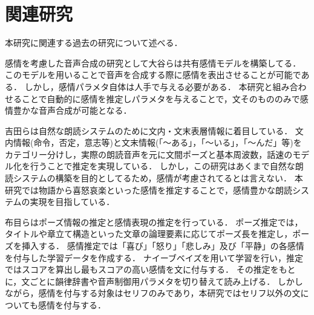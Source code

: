 \chapter{関連研究}
本研究に関連する過去の研究について述べる．

感情を考慮した音声合成の研究として大谷\cite{otani}らは共有感情モデルを構築してる．
このモデルを用いることで音声を合成する際に感情を表出させることが可能である．
しかし，感情パラメタ自体は人手で与える必要がある．
本研究と組み合わせることで自動的に感情を推定しパラメタを与えることで，文そのもののみで感情豊かな音声合成が可能となる．

吉田ら\cite{yoshida}は自然な朗読システムのために文内・文末表層情報に着目している．
文内情報(命令，否定，意志等)と文末情報(「〜ある」，「〜いる」，「〜んだ」等)をカテゴリー分けし，実際の朗読音声を元に文間ポーズと基本周波数，話速のモデル化を行うことで推定を実現している．
しかし，この研究はあくまで自然な朗読システムの構築を目的としてるため，感情が考慮されてるとは言えない．
本研究では物語から喜怒哀楽といった感情を推定することで，感情豊かな朗読システムの実現を目指している．

布目ら\cite{fume}はポーズ情報の推定と感情表現の推定を行っている．
ポーズ推定では，タイトルや章立て構造といった文章の論理要素に応じてポーズ長を推定し，ポーズを挿入する．
感情推定では「喜び」「怒り」「悲しみ」及び「平静」の各感情を付与した学習データを作成する．
ナイーブベイズを用いて学習を行い，推定ではスコアを算出し最もスコアの高い感情を文に付与する．
その推定をもとに，文ごとに韻律辞書や音声制御用パラメタを切り替えて読み上げる．
しかしながら，感情を付与する対象はセリフのみであり，本研究ではセリフ以外の文についても感情を付与する．
